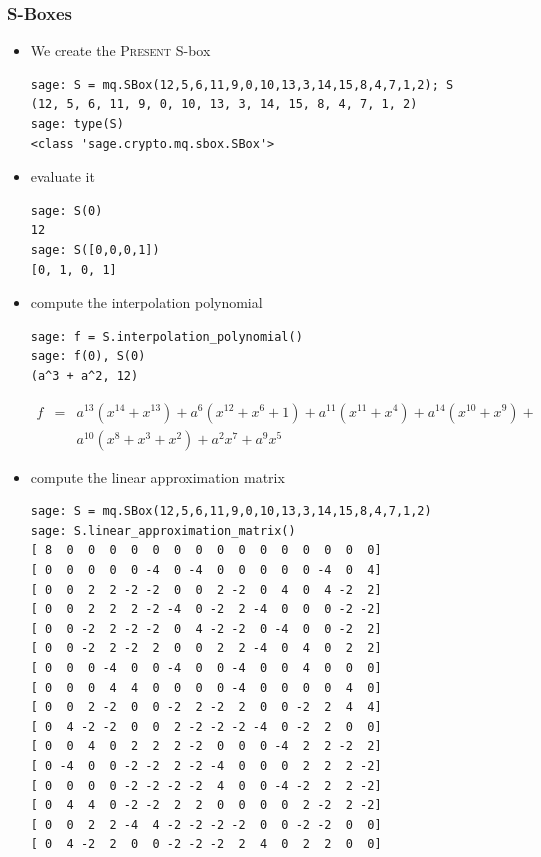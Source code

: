 \documentclass[9pt]{beamer}
\newcommand{\PRESENT}{\textsc{Present}\xspace}
\begin{document}
\begin{frame}
\frametitle{S-Boxes}

\begin{itemize}
 \item We create the \PRESENT S-box
\begin{lstlisting}
sage: S = mq.SBox(12,5,6,11,9,0,10,13,3,14,15,8,4,7,1,2); S
(12, 5, 6, 11, 9, 0, 10, 13, 3, 14, 15, 8, 4, 7, 1, 2)
sage: type(S)
<class 'sage.crypto.mq.sbox.SBox'>
\end{lstlisting}
 \item evaluate it
\begin{lstlisting}
sage: S(0)
12
sage: S([0,0,0,1])
[0, 1, 0, 1]
\end{lstlisting}
\item compute the interpolation polynomial
\begin{lstlisting}
sage: f = S.interpolation_polynomial()
sage: f(0), S(0)
(a^3 + a^2, 12)
\end{lstlisting}
\begin{eqnarray*}
f &=& a^{13}(x^{14} + x^{13}) + a^{6}(x^{12} + x^{6} + 1) +  a^{11}(x^{11} + x^4) + a^{14}(x^{10} + x^{9}) + \\
 & &  a^{10}(x^{8} + x^{3} + x^{2}) + a^{2}x^{7} + a^{9}x^{5}
\end{eqnarray*}

\framebreak

\item compute the linear approximation matrix
\begin{lstlisting}
sage: S = mq.SBox(12,5,6,11,9,0,10,13,3,14,15,8,4,7,1,2)
sage: S.linear_approximation_matrix()
[ 8  0  0  0  0  0  0  0  0  0  0  0  0  0  0  0]
[ 0  0  0  0  0 -4  0 -4  0  0  0  0  0 -4  0  4]
[ 0  0  2  2 -2 -2  0  0  2 -2  0  4  0  4 -2  2]
[ 0  0  2  2  2 -2 -4  0 -2  2 -4  0  0  0 -2 -2]
[ 0  0 -2  2 -2 -2  0  4 -2 -2  0 -4  0  0 -2  2]
[ 0  0 -2  2 -2  2  0  0  2  2 -4  0  4  0  2  2]
[ 0  0  0 -4  0  0 -4  0  0 -4  0  0  4  0  0  0]
[ 0  0  0  4  4  0  0  0  0 -4  0  0  0  0  4  0]
[ 0  0  2 -2  0  0 -2  2 -2  2  0  0 -2  2  4  4]
[ 0  4 -2 -2  0  0  2 -2 -2 -2 -4  0 -2  2  0  0]
[ 0  0  4  0  2  2  2 -2  0  0  0 -4  2  2 -2  2]
[ 0 -4  0  0 -2 -2  2 -2 -4  0  0  0  2  2  2 -2]
[ 0  0  0  0 -2 -2 -2 -2  4  0  0 -4 -2  2  2 -2]
[ 0  4  4  0 -2 -2  2  2  0  0  0  0  2 -2  2 -2]
[ 0  0  2  2 -4  4 -2 -2 -2 -2  0  0 -2 -2  0  0]
[ 0  4 -2  2  0  0 -2 -2 -2  2  4  0  2  2  0  0]
\end{lstlisting}


\end{itemize}
\end{frame}
\end{document}
